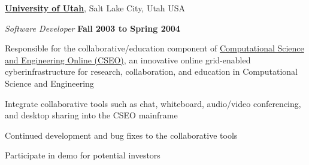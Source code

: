 \documentclass[11pt]{article}
\newenvironment{outerlist}[1][\enskip\textbullet]%
        {\begin{itemize}[#1]}{\end{itemize}%
         \vspace{-.6\baselineskip}}
\newenvironment{innerlist}[1][\enskip\textbullet]%
        {\begin{compactitem}[#1]}{\end{compactitem}}
\newcommand{\blankline}{\quad\pagebreak[2]}
\begin{document}
\blankline

\href{http://www.utah.edu/}{\textbf{University of Utah}},
Salt Lake City, Utah USA
\begin{outerlist}

\item[] \textit{Software Developer}%
        \hfill \textbf{Fall 2003 to Spring 2004}
    \begin{innerlist}
		     \item Responsible for the collaborative/education component of \href{http://therate.hec.utah.edu/}{Computational Science and Engineering Online (CSEO)}, an innovative online grid-enabled cyberinfrastructure for research, collaboration, and education in Computational Science and Engineering
		     \item Integrate collaborative tools such as chat, whiteboard, audio/video conferencing, and desktop sharing into the CSEO mainframe
		     \item Continued development and bug fixes to the collaborative tools
		     \item Participate in demo for potential investors
    \end{innerlist}

\end{outerlist}
\end{document}
